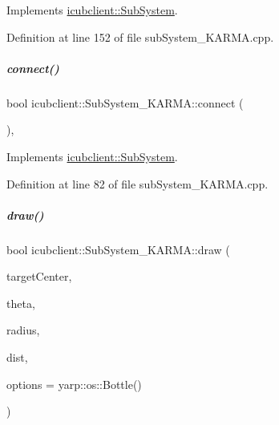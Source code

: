 Implements \hyperlink{group__icubclient__subsystems_af327c56ad0d33aada77f825d96fb47f2}{icubclient\+::\+Sub\+System}.



Definition at line 152 of file sub\+System\+\_\+\+K\+A\+R\+M\+A.\+cpp.

\mbox{\label{group__icubclient__subsystems_acc63e171efddf99fa1e57ab1cdce3a13}} 
\subparagraph{\texorpdfstring{connect()}{connect()}}
{\footnotesize\ttfamily bool icubclient\+::\+Sub\+System\+\_\+\+K\+A\+R\+M\+A\+::connect (\begin{DoxyParamCaption}{ }\end{DoxyParamCaption})\hspace{0.3cm}{\ttfamily [protected]}, {\ttfamily [virtual]}}



Implements \hyperlink{group__icubclient__subsystems_a5fc84b6e51ec56f91323280b7da52dc8}{icubclient\+::\+Sub\+System}.



Definition at line 82 of file sub\+System\+\_\+\+K\+A\+R\+M\+A.\+cpp.

\mbox{\label{group__icubclient__subsystems_a328d7187887b653399ccc783be8fb56e}} 
\subparagraph{\texorpdfstring{draw()}{draw()}}
{\footnotesize\ttfamily bool icubclient\+::\+Sub\+System\+\_\+\+K\+A\+R\+M\+A\+::draw (\begin{DoxyParamCaption}\item[{const yarp\+::sig\+::\+Vector\+Of$<$ double $>$ \&}]{target\+Center,  }\item[{const double}]{theta,  }\item[{const double}]{radius,  }\item[{const double}]{dist,  }\item[{const yarp\+::os\+::\+Bottle \&}]{options = {\ttfamily yarp\+:\+:os\+:\+:Bottle()} }\end{DoxyParamCaption})}



